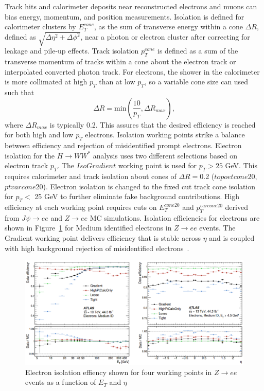Track hits and calorimeter deposits near reconstructed electrons and muons can bias energy, momentum, and position measurements. Isolation is defined for calorimeter clusters by $E_T^{cone}$, as the sum of transverse energy within a cone $\Delta R$, defined as $\sqrt{\Delta\eta^2+\Delta\phi^2}$, near a photon or electron cluster after correcting for leakage and pile-up effects. Track isolation $p_T^{cone}$ is defined as a sum of the transverse momentum of tracks within a cone about the electron track or interpolated converted photon track. For electrons, the shower in the calorimeter is more collimated at high $p_T$ than at low $p_T$, so a variable cone size can used such that 
\begin{equation}
\Delta R = \text{min}(\frac{10}{p_T},\Delta R_{max}),
\end{equation}
where $\Delta R_{max}$ is typically 0.2. This assures that the desired efficiency is reached for both high and low $p_T$ electrons. Isolation working points strike a balance between efficiency and rejection of misidentified prompt electrons. Electron isolation for the $H\rightarrow WW^*$ analysis uses two different selections based on electron track $p_T$. The $IsoGradient$ working point is used for $p_T > 25$ GeV. This requires calorimeter and track isolation about cones of $\Delta R=$0.2 ($topoetcone20$, $ptvarcone20$). Electron isolation is changed to the fixed cut track cone isolation for $p_T <$ 25 GeV to further eliminate fake background contributions. High efficiency at each working point requires cuts on $E_T^{cone20}$ and $p_T^{varcone20}$ derived from $J\psi\rightarrow ee$ and $Z\rightarrow ee$ MC simulations. Isolation efficiencies for electrons are shown in Figure~\ref{fig:ElectronIsoEff} for Medium identified electrons in $Z\rightarrow ee$ events. The Gradient working point delivers efficiency that is stable across $\eta$ and is coupled with high background rejection of misidentified electrons~\cite{ElectronPhotonPerformance}.  

\begin{figure}[!h]
        \centering
    \includegraphics[width=.65\textwidth]{Pictures/ElectronIsoEff.png}
    \caption{ Electron isolation effiency shown for four working points in $Z\rightarrow ee$ events as a function of $E_T$ and $\eta$~\cite{ElectronPhotonPerformance}}
    \label{fig:ElectronIsoEff}
\end{figure}

